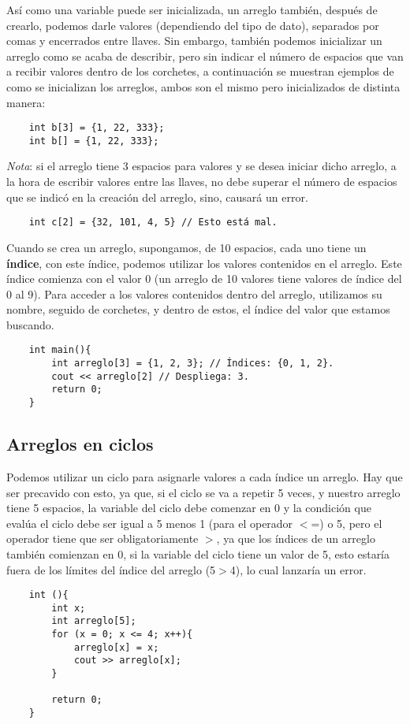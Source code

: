 Así como una variable puede ser inicializada, un arreglo también, después de crearlo, podemos darle valores (dependiendo del tipo de dato), separados por comas y encerrados entre llaves. Sin embargo, también podemos inicializar un arreglo como se acaba de describir, pero sin indicar el número de espacios que van a recibir valores dentro de los corchetes, a continuación se muestran ejemplos de como se inicializan los arreglos, ambos son el mismo pero inicializados de distinta manera:
\begin{lstlisting}
    int b[3] = {1, 22, 333};
    int b[] = {1, 22, 333};
\end{lstlisting}

\textit{Nota}: si el arreglo tiene 3 espacios para valores y se desea iniciar dicho arreglo, a la hora de escribir valores entre las llaves, no debe superar el número de espacios que se indicó en la creación del arreglo, sino, causará un error.
\begin{lstlisting}
    int c[2] = {32, 101, 4, 5} // Esto está mal.
\end{lstlisting}

Cuando se crea un arreglo, supongamos, de 10 espacios, cada uno tiene un \textbf{índice}, con este índice, podemos utilizar los valores contenidos en el arreglo. Este índice comienza con el valor 0 (un arreglo de 10 valores tiene valores de índice del 0 al 9). Para acceder a los valores contenidos dentro del arreglo, utilizamos su nombre, seguido de corchetes, y dentro de estos, el índice del valor que estamos buscando.
\begin{lstlisting}
    int main(){
        int arreglo[3] = {1, 2, 3}; // Índices: {0, 1, 2}.
        cout << arreglo[2] // Despliega: 3.
        return 0;
    }
\end{lstlisting}


\subsection{Arreglos en ciclos}

Podemos utilizar un ciclo para asignarle valores a cada índice un arreglo. Hay que ser precavido con esto, ya que, si el ciclo se va a repetir 5 veces, y nuestro arreglo tiene 5 espacios, la variable del ciclo debe comenzar en 0 y la condición que evalúa el ciclo debe ser igual a 5 menos 1 (para el operador $<$=) o 5, pero el operador tiene que ser obligatoriamente $>$, ya que los índices de un arreglo también comienzan en 0, si la variable del ciclo tiene un valor de 5, esto estaría fuera de los límites del índice del arreglo (5$>$4), lo cual lanzaría un error.
\begin{lstlisting}
    int (){
        int x;
        int arreglo[5];
        for (x = 0; x <= 4; x++){
            arreglo[x] = x;
            cout >> arreglo[x];
        }
        
        return 0;
    }
\end{lstlisting}


